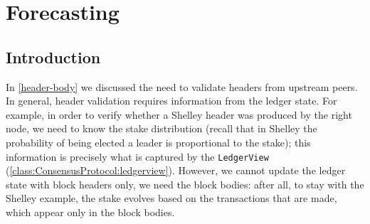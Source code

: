\section{Forecasting}
\label{ledger:forecasting}

\subsection{Introduction}

In \cref{header-body} we discussed the need to validate headers from upstream
peers. In general, header validation requires information from the ledger state.
For example, in order to verify whether a Shelley header was produced by the
right node, we need to know the stake distribution (recall that in Shelley the
probability of being elected a leader is proportional to the stake); this
information is precisely what is captured by the \lstinline!LedgerView!
(\cref{class:ConsensusProtocol:ledgerview}). However, we cannot update the
ledger state with block headers only, we need the block bodies: after all, to
stay with the Shelley example, the stake evolves based on the transactions that
are made, which appear only in the block bodies.

